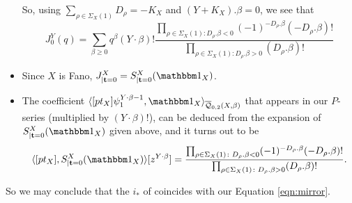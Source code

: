 \begin{itemize}[leftmargin=*]
\[ \]
So, using $\sum_{\rho\in\Sigma_X(1)} D_{\rho}=-K_X$ and $(Y+K_X).\beta=0$, we see that
\[
 J^Y_0(q)=\sum_{\beta\geq 0}q^\beta(Y\cdot\beta)!\frac{\prod_{\rho\in\Sigma_X(1)\colon D_\rho.\beta< 0}(-1)^{-D_{\rho}.\beta}(-D_{\rho}.\beta)!}{\prod_{\rho\in\Sigma_X(1)\colon D_\rho.\beta> 0}(D_{\rho}.\beta)!}
\]
\item Since $X$ is Fano, $J^X_{|{\bf t}=0}=S^X_{|{\bf t}=0}(\mathbbm 1_X)$.
\item The coefficient $\langle[pt_X]\psi_1^{Y\cdot\beta-1},\mathbbm 1_X\rangle_{\Q{0}{2}{X}{\beta}}$ that appears in our $P$-series (multiplied by $(Y\cdot\beta)!$), can be deduced from the expansion of $S^X_{|{\bf t}=0}(\mathbbm 1_X)$ given above, and it turns out to be
\[
 \langle [pt_X],S^X_{|{\bf t}=0}(\mathbbm 1_X)\rangle[z^{Y\cdot\beta}]=\frac{\prod_{\rho\in\Sigma_X(1)\colon D_\rho.\beta< 0}(-1)^{-D_{\rho}.\beta}(-D_{\rho}.\beta)!}{\prod_{\rho\in\Sigma_X(1)\colon D_\rho.\beta> 0}(D_{\rho}.\beta)!}.
\]

\end{itemize}

So we may conclude that the $i_*$ of \cite[Corollary 5.5.1]{CF-K-wallcrossing} coincides with our Equation \ref{eqn:mirror}.